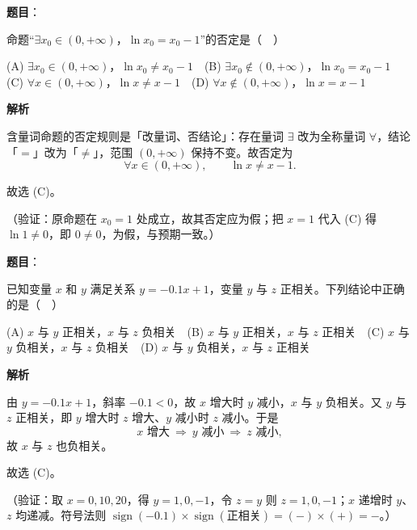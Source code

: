 \begin{answer}

\textbf{题目}：

命题“\(\exists x_0\in(0,+\infty)\)，\(\ln x_0=x_0-1\)”的否定是（　）

(A) \(\exists x_0\in(0,+\infty)\)，\(\ln x_0\neq x_0-1\)　(B) \(\exists x_0\notin(0,+\infty)\)，\(\ln x_0=x_0-1\)　(C) \(\forall x\in(0,+\infty)\)，\(\ln x\neq x-1\)　(D) \(\forall x\notin(0,+\infty)\)，\(\ln x=x-1\)

\textbf{解析}

含量词命题的否定规则是「改量词、否结论」：存在量词 \(\exists\) 改为全称量词 \(\forall\)，结论「\(=\)」改为「\(\neq\)」，范围 \((0,+\infty)\) 保持不变。故否定为
\nopagebreak[4]
\[
\forall x\in(0,+\infty),\qquad \ln x\neq x-1.
\]

故选 (C)。

（验证：原命题在 \(x_0=1\) 处成立，故其否定应为假；把 \(x=1\) 代入 (C) 得 \(\ln1\neq0\)，即 \(0\neq0\)，为假，与预期一致。）


\end{answer}
\begin{answer}

\textbf{题目}：

已知变量 \(x\) 和 \(y\) 满足关系 \(y=-0.1x+1\)，变量 \(y\) 与 \(z\) 正相关。下列结论中正确的是（　）

(A) \(x\) 与 \(y\) 正相关，\(x\) 与 \(z\) 负相关　(B) \(x\) 与 \(y\) 正相关，\(x\) 与 \(z\) 正相关　(C) \(x\) 与 \(y\) 负相关，\(x\) 与 \(z\) 负相关　(D) \(x\) 与 \(y\) 负相关，\(x\) 与 \(z\) 正相关

\textbf{解析}

由 \(y=-0.1x+1\)，斜率 \(-0.1<0\)，故 \(x\) 增大时 \(y\) 减小，\(x\) 与 \(y\) 负相关。又 \(y\) 与 \(z\) 正相关，即 \(y\) 增大时 \(z\) 增大、\(y\) 减小时 \(z\) 减小。于是
\nopagebreak[4]
\[
x\text{ 增大}\ \Rightarrow\ y\text{ 减小}\ \Rightarrow\ z\text{ 减小},
\]
故 \(x\) 与 \(z\) 也负相关。

故选 (C)。

（验证：取 \(x=0,10,20\)，得 \(y=1,0,-1\)，令 \(z=y\) 则 \(z=1,0,-1\)；\(x\) 递增时 \(y\)、\(z\) 均递减。符号法则 \(\operatorname{sign}(-0.1)\times\operatorname{sign}(\text{正相关})=(-)\times(+)=-\)。）


\end{answer}
